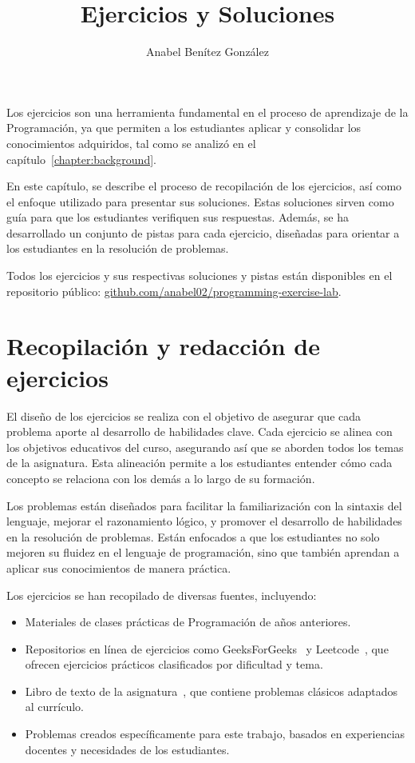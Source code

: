\documentclass{article}
\title{Ejercicios y Soluciones}
\author{Anabel Benítez González}
\date{}
\begin{document}

\maketitle

Los ejercicios son una herramienta fundamental en el proceso de aprendizaje de la Programación, ya que permiten a los estudiantes aplicar y consolidar los conocimientos adquiridos, tal como se analizó en el capítulo~\ref{chapter:background}.

En este capítulo, se describe el proceso de recopilación de los ejercicios, así como el enfoque utilizado para presentar sus soluciones. Estas soluciones sirven como guía para que los estudiantes verifiquen sus respuestas. Además, se ha desarrollado un conjunto de pistas para cada ejercicio, diseñadas para orientar a los estudiantes en la resolución de problemas.

Todos los ejercicios y sus respectivas soluciones y pistas están disponibles en el repositorio público: \href{https://github.com/anabel02/programming-exercise-lab}{github.com/anabel02/programming-exercise-lab}.

\section{Recopilación y redacción de ejercicios}
El diseño de los ejercicios se realiza con el objetivo de asegurar que cada problema aporte al desarrollo de habilidades clave. Cada ejercicio se alinea con los objetivos educativos del curso, asegurando así que se aborden todos los temas de la asignatura. Esta alineación permite a los estudiantes entender cómo cada concepto se relaciona con los demás a lo largo de su formación.

Los problemas están diseñados para facilitar la familiarización con la sintaxis del lenguaje, mejorar el razonamiento lógico, y promover el desarrollo de habilidades en la resolución de problemas. Están enfocados a que los estudiantes no solo mejoren su fluidez en el lenguaje de programación, sino que también aprendan a aplicar sus conocimientos de manera práctica. 

Los ejercicios se han recopilado de diversas fuentes, incluyendo:
\begin{itemize}
    \item Materiales de clases prácticas de Programación de años anteriores.
    \item Repositorios en línea de ejercicios como GeeksForGeeks~\cite{geeksforgeeks} y Leetcode~\cite{leetcode}, que ofrecen ejercicios prácticos clasificados por dificultad y tema.
    \item Libro de texto de la asignatura~\cite{katrib_programar}, que contiene problemas clásicos adaptados al currículo.
    \item Problemas creados específicamente para este trabajo, basados en experiencias docentes y necesidades de los estudiantes.
\end{itemize}
\end{document}
